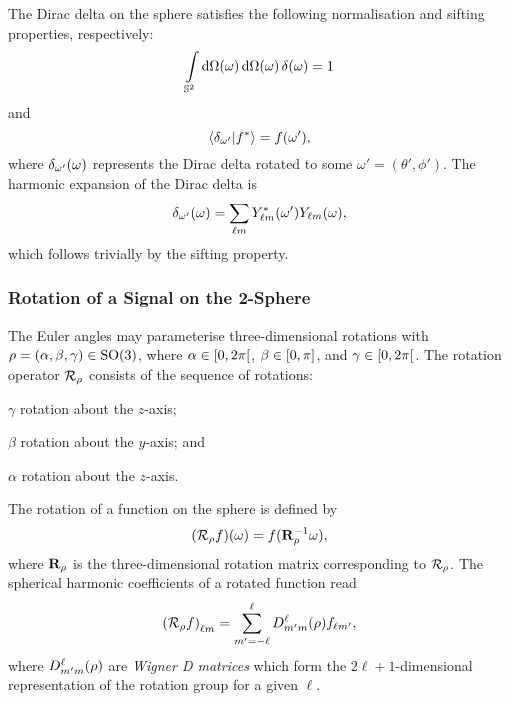 The Dirac delta on the sphere satisfies the following normalisation and sifting properties, respectively:
%
\begin{equation}
	\integrateSphere{\omega} \dd{\pixel{\Omega}} \pixel{\delta}
	= 1
\end{equation}
%
and
%
\begin{equation}
	\braket{\delta_{\omega'}}{\conj{f}}
	= \pixel[']{f},
\end{equation}
%
where \(\pixel{\delta_{\omega'}}\) represents the Dirac delta rotated to some \(\omega'=(\theta',\phi')\).
The harmonic expansion of the Dirac delta is
%
\begin{equation}\label{eq:chapter2_dirac_omega}
	\pixel{\delta_{\omega'}} = \harmonicSum \pixel[']{\conj{\harmonic{Y}}} \pixel{\harmonic{Y}},
\end{equation}
%
which follows trivially by the sifting property.

\subsubsection{Rotation of a Signal on the 2-Sphere}

The Euler angles may parameterise three-dimensional rotations with \(\rho = (\alpha,\beta,\gamma) \in \rotationGroup{}\), where \(\alpha \in \interval[open right]{0}{2\pi}\), \(\beta \in \interval{0}{\pi}\), and \(\gamma \in \interval[open right]{0}{2\pi}\).
The rotation operator \(\rotation{\rho}\) consists of the sequence of rotations:
%
\begin{inparaenum}[(i)]
	\item \({\gamma}\) rotation about the \(z\)-axis;
	\item \({\beta}\) rotation about the \(y\)-axis; and
	\item \({\alpha}\) rotation about the \(z\)-axis.
\end{inparaenum}
%
The rotation of a function on the sphere is defined by
%
\begin{equation}
	\pixel{(\rotation{\rho}f)}
	= f(\vb{R}_{\rho}^{-1} \omega),
\end{equation}
%
where \(\vb{R}_{\rho}\) is the three-dimensional rotation matrix corresponding to \(\rotation{\rho}\).
The spherical harmonic coefficients of a rotated function read
%
\begin{equation}\label{eq:chapter2_rotation_matrix}
	\harmonic{(\rotation{\rho}f)} = \sum\limits_{m'=-\ell}^{\ell} \wigner{\ell}{m'}{m}(\rho) f_{\ell m'},
\end{equation}
%
where \(\wigner{\ell}{m'}{m}(\rho)\) are \emph{Wigner D matrices} which form the \(2\ell+1\)-dimensional representation of the rotation group for a given \({\ell}\).

